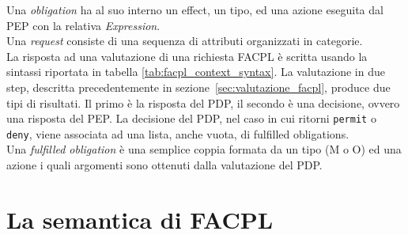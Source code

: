 Una \textit{obligation} ha al suo interno un effect, un tipo, ed una azione eseguita dal PEP con la relativa \textit{Expression}.\\
Una \textit{request} consiste di una sequenza di attributi organizzati in categorie.\\
La risposta ad una valutazione di una richiesta FACPL è scritta usando la sintassi riportata in tabella \ref{tab:facpl_context_syntax}.
La valutazione in due step, descritta precedentemente in sezione~\ref{sec:valutazione_facpl}, produce due tipi di risultati. Il primo è la risposta del PDP, il secondo è una decisione, ovvero una risposta del PEP.
La decisione del PDP, nel caso in cui ritorni \texttt{permit} o \texttt{deny}, viene associata ad una lista, anche vuota, di fulfilled obligations.\\
Una \textit{fulfilled obligation} è una semplice coppia formata da un tipo (M o O) ed una azione i quali argomenti sono ottenuti dalla valutazione del PDP.

\section{La semantica di FACPL}

